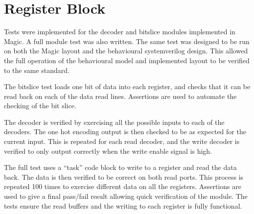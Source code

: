 
\section{Register Block}

Tests were implemented for the decoder and bitslice modules implemented in Magic. 
A full module test was also written. 
The same test was designed to be run on both the Magic layout and the behavioural systemverilog design. 
This allowed the full operation of the behavioural model and implemented layout to be verified to the same standard. 

The bitslice test loads one bit of data into each register, and checks that it can be read back on each of the data read lines.
Assertions are used to automate the checking of the bit slice.

The decoder is verified by exercising all the possible inputs to each of the decoders.
The one hot encoding output is then checked to be as expected for the current input. %
This is repeated for each read decoder, and the write decoder is verified to only output correctly when the write enable signal is high. 

The full test uses a ``task'' code block to write to a register and read the data back.
The data is then verified to be correct on both read ports.
This process is repeated 100 times to exercise different data on all the registers. 
Assertions are used to give a final pass/fail result allowing quick verification of the module.
The tests ensure the read buffers and the writing to each register is fully functional.




